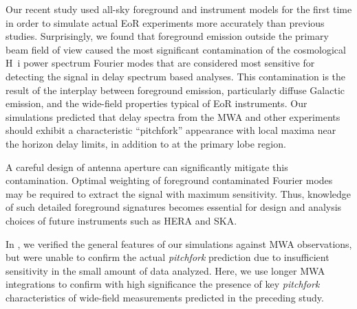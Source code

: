 \documentclass[preprint2,apjl,numberedappendix,twocolappendix,appendixfloats]{emulateapj}
\begin{document}

Our recent study \citep{thy15} used all-sky foreground and instrument models for the first time in order to simulate actual EoR experiments more accurately than previous studies. Surprisingly, we found that foreground emission outside the primary beam field of view caused the most significant contamination of the cosmological H~{\sc i} power spectrum Fourier modes that are considered most sensitive for detecting the signal in delay spectrum based analyses. This contamination is the result of the interplay between foreground emission, particularly diffuse Galactic emission, and the wide-field properties typical of EoR instruments. Our simulations predicted that delay spectra from the MWA and other experiments should exhibit a characteristic ``pitchfork'' appearance with local maxima near the horizon delay limits, in addition to at the primary lobe region.  

A careful design of antenna aperture can significantly mitigate this contamination. Optimal weighting of foreground contaminated Fourier modes may be required to extract the signal with maximum sensitivity. Thus, knowledge of such detailed foreground signatures becomes essential for design and analysis choices of future instruments such as HERA and SKA.

In \citet{thy15}, we verified the general features of our simulations against MWA observations, but were unable to confirm the actual {\it pitchfork} prediction due to insufficient sensitivity in the small amount of data analyzed. Here, we use longer MWA integrations to confirm with high significance the presence of key {\it pitchfork} characteristics of wide-field measurements predicted in the preceding study.  
\end{document}
